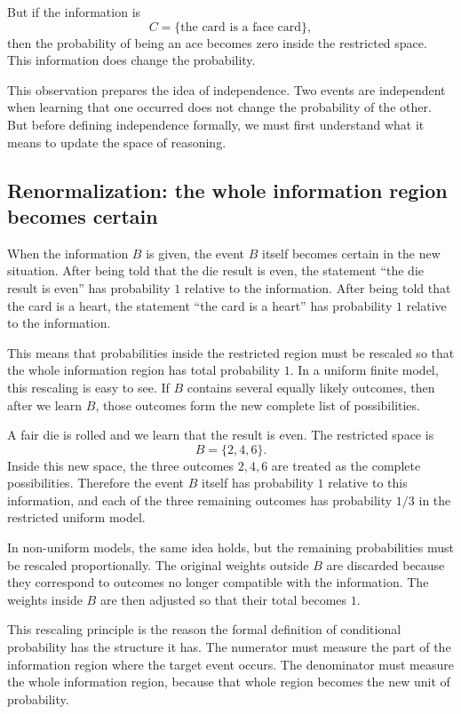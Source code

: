 But if the information is
\[
C=\{\text{the card is a face card}\},
\]
then the probability of being an ace becomes zero inside the restricted space.
This information does change the probability.

This observation prepares the idea of independence. Two events are independent
when learning that one occurred does not change the probability of the other.
But before defining independence formally, we must first understand what it means
to update the space of reasoning.

\subsection*{Renormalization: the whole information region becomes certain}

When the information \(B\) is given, the event \(B\) itself becomes certain in
the new situation. After being told that the die result is even, the statement
``the die result is even'' has probability \(1\) relative to the information.
After being told that the card is a heart, the statement ``the card is a heart''
has probability \(1\) relative to the information.

This means that probabilities inside the restricted region must be rescaled so
that the whole information region has total probability \(1\). In a uniform
finite model, this rescaling is easy to see. If \(B\) contains several equally
likely outcomes, then after we learn \(B\), those outcomes form the new complete
list of possibilities.

\begin{examplebox}
A fair die is rolled and we learn that the result is even. The restricted space
is
\[
B=\{2,4,6\}.
\]
Inside this new space, the three outcomes \(2,4,6\) are treated as the complete
possibilities. Therefore the event \(B\) itself has probability \(1\) relative to
this information, and each of the three remaining outcomes has probability
\(1/3\) in the restricted uniform model.
\end{examplebox}

In non-uniform models, the same idea holds, but the remaining probabilities must
be rescaled proportionally. The original weights outside \(B\) are discarded
because they correspond to outcomes no longer compatible with the information.
The weights inside \(B\) are then adjusted so that their total becomes \(1\).

This rescaling principle is the reason the formal definition of conditional
probability has the structure it has. The numerator must measure the part of the
information region where the target event occurs. The denominator must measure
the whole information region, because that whole region becomes the new unit of
probability.

